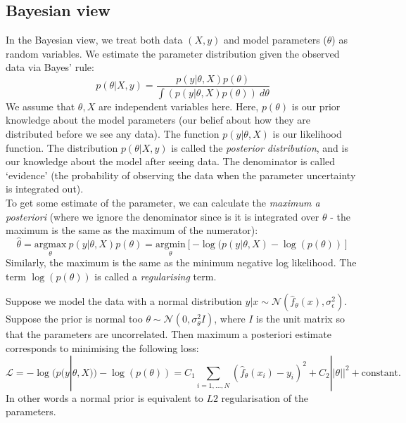 \newpage

\subsection{Bayesian view}
In the Bayesian view, we treat both data $(X,y)$ and model parameters ($\theta$) as random variables. We estimate the parameter distribution given the observed data via Bayes' rule:
\begin{equation*}
p(\theta | X,y) = \frac{p(y | \theta,X) p(\theta)}{\displaystyle \int \left( p(y | \theta,X) p(\theta) \right) \ d\theta}
\end{equation*}
We assume that $\theta, X$ are independent variables here. Here, $p(\theta)$ is our prior knowledge about the model parameters (our belief about how they are distributed before we see any data). The function $p(y | \theta, X)$ is our likelihood function. The distribution $p(\theta | X,y)$ is called the \textit{posterior distribution}, and is our knowledge about the model after seeing data. The denominator is called `evidence' (the probability of observing the data when the parameter uncertainty is integrated out). \\

To get some estimate of the parameter, we can calculate the \textit{maximum a posteriori} (where we ignore the denominator since is it is integrated over $\theta$ - the maximum is the same as the maximum of the numerator):
\begin{equation*}
\hat{\theta} = \underset{\theta}{\textrm{argmax}}\ p(y | \theta, X) p(\theta) = \underset{\theta}{\textrm{argmin}}\left[ - \log(p(y | \theta, X) - \log(p(\theta)) \right]
\end{equation*}
Similarly, the maximum is the same as the minimum negative log likelihood. The term $\log(p(\theta))$ is called a \textit{regularising} term.

\begin{frameex}
Suppose we model the data with a normal distribution $y|x \sim \mathcal{N}(\hat{f}_{\theta}(x), \sigma_{\epsilon}^2)$. Suppose the prior is normal too $\theta \sim \mathcal{N}(0, \sigma_{\theta}^2 I)$, where $I$ is the unit matrix so that the parameters are uncorrelated. Then maximum a posteriori estimate corresponds to minimising the following loss:
\begin{equation*}
\mathcal{L} = -\log(p(y|\theta,X)) - \log(p(\theta)) = C_1 \sum_{i=1,...,N} (\hat{f}_{\theta}(x_i) - y_i)^2 + C_2 || \theta||^2 + \text{constant}.
\end{equation*}
In other words a normal prior is equivalent to $L2$ regularisation of the parameters.
\end{frameex} 


